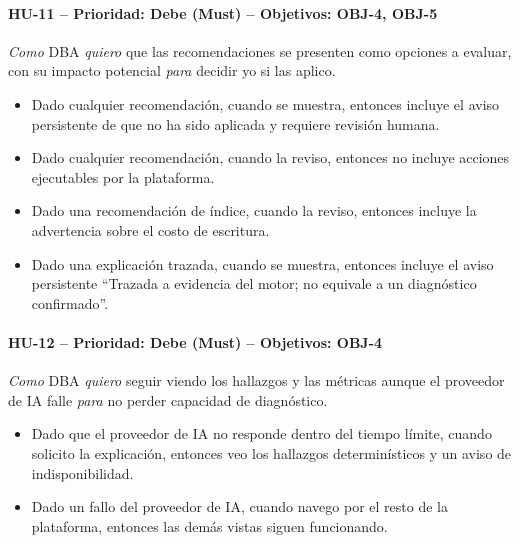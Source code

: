 \documentclass[11pt,a4paper]{report}
\begin{document}
\paragraph{HU-11 -- Prioridad: Debe (Must) -- Objetivos: OBJ-4, OBJ-5}
\textit{Como} DBA \textit{quiero} que las recomendaciones se presenten como opciones a evaluar, con su impacto potencial \textit{para} decidir yo si las aplico.
\begin{itemize}[leftmargin=1.3em,itemsep=1pt]
\item[\textbf{CA-HU11.1}] Dado cualquier recomendación, cuando se muestra, entonces incluye el aviso persistente de que no ha sido aplicada y requiere revisión humana.
\item[\textbf{CA-HU11.2}] Dado cualquier recomendación, cuando la reviso, entonces no incluye acciones ejecutables por la plataforma.
\item[\textbf{CA-HU11.3}] Dado una recomendación de índice, cuando la reviso, entonces incluye la advertencia sobre el costo de escritura.
\item[\textbf{CA-HU11.4}] Dado una explicación trazada, cuando se muestra, entonces incluye el aviso persistente \textquotedblleft Trazada a evidencia del motor; no equivale a un diagnóstico confirmado\textquotedblright.
\end{itemize}

\paragraph{HU-12 -- Prioridad: Debe (Must) -- Objetivos: OBJ-4}
\textit{Como} DBA \textit{quiero} seguir viendo los hallazgos y las métricas aunque el proveedor de IA falle \textit{para} no perder capacidad de diagnóstico.
\begin{itemize}[leftmargin=1.3em,itemsep=1pt]
\item[\textbf{CA-HU12.1}] Dado que el proveedor de IA no responde dentro del tiempo límite, cuando solicito la explicación, entonces veo los hallazgos determinísticos y un aviso de indisponibilidad.
\item[\textbf{CA-HU12.2}] Dado un fallo del proveedor de IA, cuando navego por el resto de la plataforma, entonces las demás vistas siguen funcionando.
\end{itemize}
\end{document}
